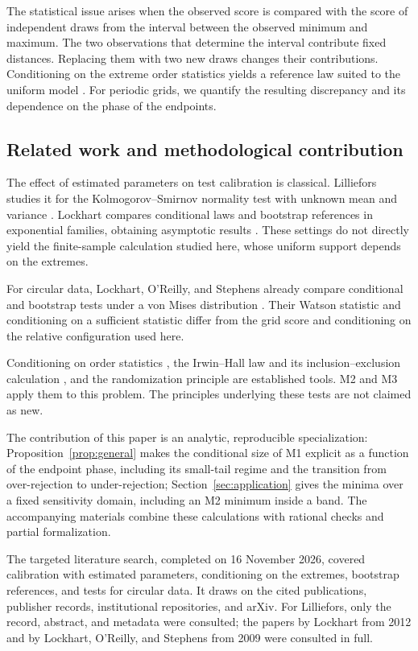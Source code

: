 \documentclass[11pt,a4paper]{article}
\begin{document}
The statistical issue arises when the observed score is compared with the score of independent draws from the interval between the observed minimum and maximum. The two observations that determine the interval contribute fixed distances. Replacing them with two new draws changes their contributions. Conditioning on the extreme order statistics yields a reference law suited to the uniform model \cite{order}. For periodic grids, we quantify the resulting discrepancy and its dependence on the phase of the endpoints.

\subsection{Related work and methodological contribution}\label{sec:prior}

The effect of estimated parameters on test calibration is classical. Lilliefors studies it for the Kolmogorov--Smirnov normality test with unknown mean and variance \cite{lilliefors}. Lockhart compares conditional laws and bootstrap references in exponential families, obtaining asymptotic results \cite{lockhart}. These settings do not directly yield the finite-sample calculation studied here, whose uniform support depends on the extremes.

For circular data, Lockhart, O'Reilly, and Stephens already compare conditional and bootstrap tests under a von Mises distribution \cite{vonmises}. Their Watson statistic and conditioning on a sufficient statistic differ from the grid score and conditioning on the relative configuration used here.

Conditioning on order statistics \cite{order}, the Irwin--Hall law and its inclusion--exclusion calculation \cite{irwinhall}, and the randomization principle \cite{hemerik} are established tools. M2 and M3 apply them to this problem. The principles underlying these tests are not claimed as new.

The contribution of this paper is an analytic, reproducible specialization: Proposition~\ref{prop:general} makes the conditional size of M1 explicit as a function of the endpoint phase, including its small-tail regime and the transition from over-rejection to under-rejection; Section~\ref{sec:application} gives the minima over a fixed sensitivity domain, including an M2 minimum inside a band. The accompanying materials combine these calculations with rational checks and partial formalization.

The targeted literature search, completed on 16 November 2026, covered calibration with estimated parameters, conditioning on the extremes, bootstrap references, and tests for circular data. It draws on the cited publications, publisher records, institutional repositories, and arXiv. For Lilliefors, only the record, abstract, and metadata were consulted; the papers by Lockhart from 2012 and by Lockhart, O'Reilly, and Stephens from 2009 were consulted in full.
\end{document}

